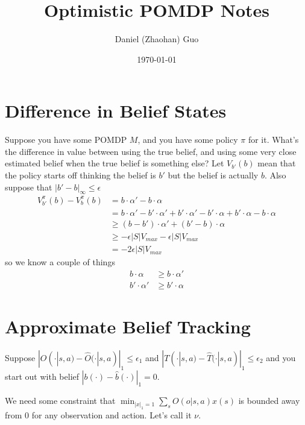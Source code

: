 \documentclass[10pt,english]{article}
\title{Optimistic POMDP Notes}
\author{Daniel (Zhaohan) Guo}
\date{\today}
\begin{document}
\maketitle


\section{Difference in Belief States}

Suppose you have some POMDP $M$, and you have some policy $\pi$ for it. What's the difference in value between using the true belief, and using some very close estimated belief when the true belief is something else? Let $V_{b'}(b)$ mean that the policy starts off thinking the belief is $b'$ but the belief is actually $b$. Also suppose that $|b'-b|_{\infty}\leq \epsilon$
\begin{align}
V^{\pi}_{b'}(b) - V^{\pi}_b(b) &= b \cdot \alpha' - b\cdot \alpha \\
&= b \cdot \alpha' - b' \cdot \alpha' + b' \cdot \alpha' - b'\cdot \alpha + b' \cdot \alpha - b\cdot \alpha \\
&\geq (b-b') \cdot \alpha'+ (b'-b) \cdot \alpha \\
&\geq -\epsilon|S|V_{max} -\epsilon|S|V_{max} \\
&= -2\epsilon|S|V_{max}
\end{align}
so we know a couple of things
\begin{align}
b\cdot \alpha &\geq b \cdot \alpha' \\
b'\cdot \alpha' &\geq b' \cdot \alpha
\end{align}

\section{Approximate Belief Tracking}

Suppose $|O(\cdot|s,a) - \widehat{O}(\cdot|s,a)|_{1} \leq \epsilon_1$ and $|T(\cdot|s,a) - \widehat{T}(\cdot|s,a)|_{1} \leq \epsilon_2$ and you start out with belief $|b(\cdot) - \widehat{b}(\cdot)|_{1} = 0$.

We need some constraint that $\min_{|x|_1=1} \sum_{s} O(o|s,a)x(s)$ is bounded away from $0$ for any observation and action. Let's call it $\nu$.
\end{document}
